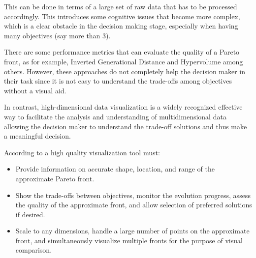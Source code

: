 This can be done in terms of a large set of raw data that has to be processed accordingly. This introduces some cognitive issues that become more complex, which is a clear obstacle in the decision making stage, especially when having many objectives (say more than 3).

There are some performance metrics that can evaluate the quality of a Pareto front, as for example, Inverted Generational Distance \citep{Bosman2003} and Hypervolume \citep{Zitzler1999} among others. However, these approaches do not completely help the decision maker in their task since it is not easy to understand the trade-offs among objectives without a visual aid.

In contrast, high-dimensional data visualization is a widely recognized effective way to facilitate the analysis and understanding of multidimensional data  allowing the decision maker to understand the trade-off solutions and thus make a meaningful decision.

According to \citet{Gao2019} a high quality visualization tool must: 
\begin{itemize}
\item  Provide information on accurate shape, location, and range of the approximate Pareto front. 
\item  Show the trade-offs between objectives, monitor the evolution progress, assess the quality of the approximate front, and allow selection of preferred solutions if desired. 
\item  Scale to any dimensions, handle a large number of points on the approximate front, and simultaneously visualize multiple fronts for the purpose of visual comparison.
\end{itemize}

